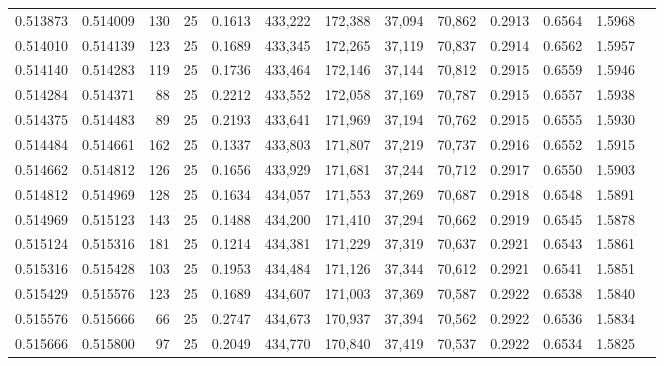 \begin{tabular}{rrrrrrrrrrrrr}
0.513873 & 0.514009 &   130 &  25 &                                     0.1613 & 433,222 & 172,388 &  37,094 &  70,862 & 0.2913 & 0.6564 & 1.5968 \\
0.514010 & 0.514139 &   123 &  25 &                                     0.1689 & 433,345 & 172,265 &  37,119 &  70,837 & 0.2914 & 0.6562 & 1.5957 \\
0.514140 & 0.514283 &   119 &  25 &                                     0.1736 & 433,464 & 172,146 &  37,144 &  70,812 & 0.2915 & 0.6559 & 1.5946 \\
0.514284 & 0.514371 &    88 &  25 &                                     0.2212 & 433,552 & 172,058 &  37,169 &  70,787 & 0.2915 & 0.6557 & 1.5938 \\
0.514375 & 0.514483 &    89 &  25 &                                     0.2193 & 433,641 & 171,969 &  37,194 &  70,762 & 0.2915 & 0.6555 & 1.5930 \\
0.514484 & 0.514661 &   162 &  25 &                                     0.1337 & 433,803 & 171,807 &  37,219 &  70,737 & 0.2916 & 0.6552 & 1.5915 \\
0.514662 & 0.514812 &   126 &  25 &                                     0.1656 & 433,929 & 171,681 &  37,244 &  70,712 & 0.2917 & 0.6550 & 1.5903 \\
0.514812 & 0.514969 &   128 &  25 &                                     0.1634 & 434,057 & 171,553 &  37,269 &  70,687 & 0.2918 & 0.6548 & 1.5891 \\
0.514969 & 0.515123 &   143 &  25 &                                     0.1488 & 434,200 & 171,410 &  37,294 &  70,662 & 0.2919 & 0.6545 & 1.5878 \\
0.515124 & 0.515316 &   181 &  25 &                                     0.1214 & 434,381 & 171,229 &  37,319 &  70,637 & 0.2921 & 0.6543 & 1.5861 \\
0.515316 & 0.515428 &   103 &  25 &                                     0.1953 & 434,484 & 171,126 &  37,344 &  70,612 & 0.2921 & 0.6541 & 1.5851 \\
0.515429 & 0.515576 &   123 &  25 &                                     0.1689 & 434,607 & 171,003 &  37,369 &  70,587 & 0.2922 & 0.6538 & 1.5840 \\
0.515576 & 0.515666 &    66 &  25 &                                     0.2747 & 434,673 & 170,937 &  37,394 &  70,562 & 0.2922 & 0.6536 & 1.5834 \\
0.515666 & 0.515800 &    97 &  25 &                                     0.2049 & 434,770 & 170,840 &  37,419 &  70,537 & 0.2922 & 0.6534 & 1.5825 \\

\end{tabular}
